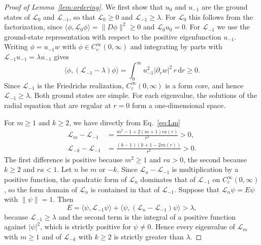 \documentclass[11pt,a4paper]{article}
\theoremstyle{remark}
\theoremstyle{plain}
\newcommand{\ip}[2]{\langle #1,#2\rangle}
\begin{document}
\begin{proof}[Proof of Lemma~\ref{lem:ordering}]
We first show that $u_0$ and $u_{-1}$ are the ground states of
$\mathcal L_0$ and $\mathcal L_{-1}$, so that $\mathcal L_0\ge0$ and
$\mathcal L_{-1}\ge\lambda$. For $\mathcal L_0$ this follows from the
factorization, since $\ip{\phi}{\mathcal L_0\phi}=\|D\phi\|^2\ge0$ and
$\mathcal L_0u_0=0$. For $\mathcal L_{-1}$ we use the ground-state
representation with respect to the positive eigenfunction $u_{-1}$.
Writing $\phi=u_{-1}w$ with $\phi\in C_c^\infty(0,\infty)$ and
integrating by parts with $\mathcal L_{-1}u_{-1}=\lambda u_{-1}$ gives
\begin{equation*}
 \ip{\phi}{(\mathcal L_{-1}-\lambda)\phi}
   =\int_0^\infty u_{-1}^2|\partial_rw|^2\,r\,\mathrm{d}r\ge0.
\end{equation*}
Since $\mathcal L_{-1}$ is the Friedrichs realization,
$C_c^\infty(0,\infty)$ is a form core, and hence
$\mathcal L_{-1}\ge\lambda$. Both ground states are simple. For each
eigenvalue, the solutions of the radial equation that are regular at
$r=0$ form a one-dimensional space.

For $m\ge1$ and $k\ge2$, we have directly from Eq.~\eqref{eq:Lm}
\begin{align*}
 \mathcal L_m-\mathcal L_{-1}&=\frac{m^2-1+2(m+1)ra(r)}{r^2}>0,\\
 \mathcal L_{-k}-\mathcal L_{-1}&=\frac{(k-1)(k+1-2ra(r))}{r^2}>0.
\end{align*}
The first difference is positive because $m^2\ge1$ and $r a>0$, the
second because $k\ge2$ and $r a<1$. Let $n$ be $m$ or
$-k$. Since $\mathcal L_n-\mathcal L_{-1}$ is multiplication by a
positive function, the quadratic form of $\mathcal L_n$ dominates that
of $\mathcal L_{-1}$ on $C_c^\infty(0,\infty)$, so the form domain of
$\mathcal L_n$ is contained in that of $\mathcal L_{-1}$. Suppose that
$\mathcal L_n\psi=E\psi$ with $\|\psi\|=1$. Then
\begin{equation*}
 E=\ip{\psi}{\mathcal L_{-1}\psi}
   +\ip{\psi}{(\mathcal L_n-\mathcal L_{-1})\psi}>\lambda,
\end{equation*}
because $\mathcal L_{-1}\ge\lambda$ and the second term is the integral
of a positive function against $|\psi|^2$, which is strictly positive
for $\psi\ne0$. Hence every eigenvalue of $\mathcal L_m$ with
$m\ge1$ and of $\mathcal L_{-k}$ with $k\ge2$ is strictly greater
than $\lambda$.


\end{proof}
\end{document}
